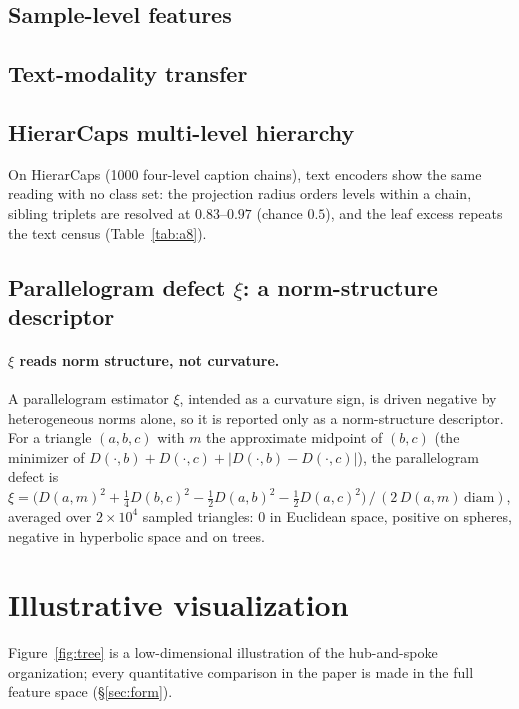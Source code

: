 \documentclass{article}
\begin{document}
\subsection{Sample-level features}
\label{app:sample}

\FloatBarrier
\subsection{Text-modality transfer}

\FloatBarrier
\subsection{HierarCaps multi-level hierarchy}
\label{app:hierarcaps}
On HierarCaps \citep{alper2024hierarcaps} (1000 four-level caption chains), text encoders show the same reading with no class set: the projection radius orders levels within a chain, sibling triplets are resolved at $0.83$--$0.97$ (chance $0.5$), and the leaf excess repeats the text census (Table~\ref{tab:a8}). %

\FloatBarrier
\subsection{Parallelogram defect $\xi$: a norm-structure descriptor}
\label{app:xi}
\paragraph{$\xi$ reads norm structure, not curvature.} A parallelogram estimator $\xi$, intended as a curvature sign, is driven negative by heterogeneous norms alone, so it is reported only as a norm-structure descriptor. %
For a triangle $(a,b,c)$ with $m$ the approximate midpoint of $(b,c)$ (the minimizer of $D(\cdot,b){+}D(\cdot,c){+}|D(\cdot,b){-}D(\cdot,c)|$), the parallelogram defect is $\xi = \big(D(a,m)^2 + \tfrac14 D(b,c)^2 - \tfrac12 D(a,b)^2 - \tfrac12 D(a,c)^2\big)\,/\,(2\,D(a,m)\,\mathrm{diam})$, averaged over $2{\times}10^4$ sampled triangles: $0$ in Euclidean space, positive on spheres, negative in hyperbolic space and on trees.



\FloatBarrier
\section{Illustrative visualization}
\label{app:viz}
Figure~\ref{fig:tree} is a low-dimensional illustration of the hub-and-spoke organization; every quantitative comparison in the paper is made in the full feature space (\S\ref{sec:form}).
\end{document}
